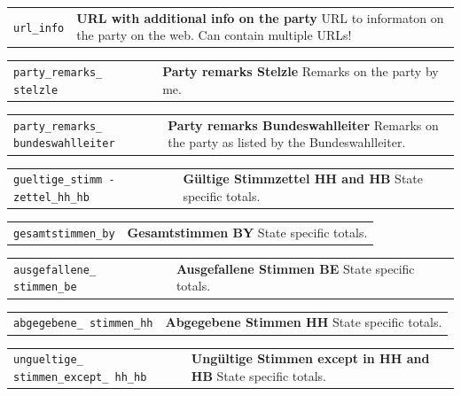 \documentclass[
]{scrartcl}
\begin{document}
\begin{longtable}{p{3.2cm}| p{11cm}}
\texttt{url\_info} &\textbf{URL with additional info on the party}\newline 
URL to informaton on the party on the web. Can contain multiple URLs!
\end{longtable}

\begin{longtable}{p{3.2cm}| p{11cm}}
\texttt{party\_remarks\_
stelzle} &\textbf{Party remarks Stelzle}\newline 
Remarks on the party by me.
\end{longtable}

\begin{longtable}{p{3.2cm}| p{11cm}}
\texttt{party\_remarks\_
bundeswahlleiter} &\textbf{Party remarks Bundeswahlleiter}\newline 
Remarks on the party as listed by the Bundeswahlleiter.
\end{longtable}

\begin{longtable}{p{3.2cm}| p{11cm}}
\texttt{gueltige\_stimm
-zettel\_hh\_hb} &\textbf{Gültige Stimmzettel HH and HB}\newline 
State specific totals.
\end{longtable}

\begin{longtable}{p{3.2cm}| p{11cm}}
\texttt{gesamtstimmen\_by} &\textbf{Gesamtstimmen BY}\newline 
State specific totals.
\end{longtable}

\begin{longtable}{p{3.2cm}| p{11cm}}
\texttt{ausgefallene\_
stimmen\_be} &\textbf{Ausgefallene Stimmen BE}\newline 
State specific totals.
\end{longtable}

\begin{longtable}{p{3.2cm}| p{11cm}}
\texttt{abgegebene\_
stimmen\_hh} &\textbf{Abgegebene Stimmen HH}\newline 
State specific totals.
\end{longtable}

\begin{longtable}{p{3.2cm}| p{11cm}}
\texttt{ungueltige\_
stimmen\_except\_
hh\_hb} &\textbf{Ungültige Stimmen except in HH and HB}\newline 
State specific totals.
\end{longtable}
\end{document}
